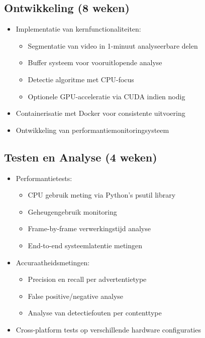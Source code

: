 \subsection{Ontwikkeling (8 weken)}
\begin{itemize}
    \item Implementatie van kernfunctionaliteiten:
    \begin{itemize}
        \item Segmentatie van video in 1-minuut analyseerbare delen
        \item Buffer systeem voor vooruitlopende analyse
        \item Detectie algoritme met CPU-focus
        \item Optionele GPU-acceleratie via CUDA indien nodig
    \end{itemize}
    \item Containerisatie met Docker voor consistente uitvoering
    \item Ontwikkeling van performantiemonitoringsysteem
\end{itemize}

\subsection{Testen en Analyse (4 weken)}
\begin{itemize}
    \item Performantietests:
    \begin{itemize}
        \item CPU gebruik meting via Python's psutil library
        \item Geheugengebruik monitoring
        \item Frame-by-frame verwerkingstijd analyse
        \item End-to-end systeemlatentie metingen
    \end{itemize}
    \item Accuraatheidsmetingen:
    \begin{itemize}
        \item Precision en recall per advertentietype
        \item False positive/negative analyse
        \item Analyse van detectiefouten per contenttype
    \end{itemize}
    \item Cross-platform tests op verschillende hardware configuraties
\end{itemize}

